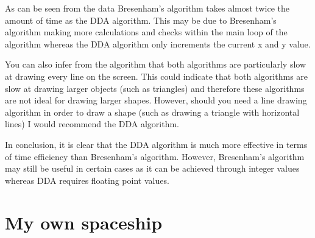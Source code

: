 \documentclass[
	a4paper, %
	10pt, %
]{CSUniSchoolLabReport}
\begin{document}
\begin{flushleft}
	As can be seen from the data Bresenham's algorithm takes almost twice the amount of time 
	as the DDA algorithm. This may be due to Bresenham's algorithm making more calculations and checks
	within the main loop of the algorithm whereas the DDA algorithm only increments the current x and y value.
\end{flushleft}
\begin{flushleft}
	You can also infer from the algorithm that both algorithms are particularly slow at drawing every line 
	on the screen. This could indicate that both algorithms are slow at drawing larger objects (such as triangles)
	and therefore these algorithms are not ideal for drawing larger shapes. However, should you need a line 
	drawing algorithm in order to draw a shape (such as drawing a triangle with horizontal lines) I would recommend
	the DDA algorithm.
\end{flushleft}
\begin{flushleft}
	In conclusion, it is clear that the DDA algorithm is much more effective in terms of time efficiency than
	Bresenham's algorithm. However, Bresenham's algorithm may still be useful in certain cases as it can be 
	achieved through integer values whereas DDA requires floating point values.
\end{flushleft}
\section{My own spaceship}

\subsection*{}

\printbibliography%

\end{document}
